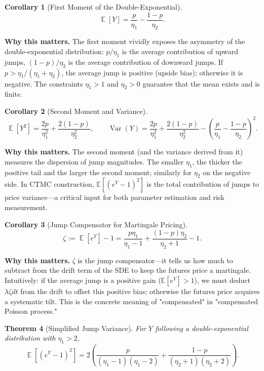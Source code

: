 \documentclass[11pt,a4paper,openany]{book}
\theoremstyle{definition}
\theoremstyle{plain}
\newtheorem{theorem}{Theorem}[chapter]
\newtheorem{corollary}[theorem]{Corollary}
\theoremstyle{remark}
\DeclareMathOperator{\E}{\mathbb{E}}
\DeclareMathOperator{\Var}{Var}
\newcommand{\1}{\mathbbm{1}}
\begin{document}
\begin{corollary}[First Moment of the Double-Exponential]
\[
\E[Y] = \frac{p}{\eta_{1}} - \frac{1-p}{\eta_{2}}.
\]
\end{corollary}

\medskip
\noindent\textbf{Why this matters.} The first moment vividly exposes the asymmetry of the double-exponential distribution: $p/\eta_1$ is the average contribution of upward jumps, $(1-p)/\eta_2$ is the average contribution of downward jumps. If $p > \eta_1/(\eta_1 + \eta_2)$, the average jump is positive (upside bias); otherwise it is negative. The constraints $\eta_1 > 1$ and $\eta_2 > 0$ guarantee that the mean exists and is finite.

\begin{corollary}[Second Moment and Variance]
\[
\E[Y^{2}] = \frac{2p}{\eta_{1}^{2}} + \frac{2(1-p)}{\eta_{2}^{2}}, \qquad
\Var(Y) = \frac{2p}{\eta_{1}^{2}} + \frac{2(1-p)}{\eta_{2}^{2}} - \left(\frac{p}{\eta_{1}} - \frac{1-p}{\eta_{2}}\right)^{2}.
\]
\end{corollary}

\medskip
\noindent\textbf{Why this matters.} The second moment (and the variance derived from it) measures the dispersion of jump magnitudes. The smaller $\eta_1$, the thicker the positive tail and the larger the second moment; similarly for $\eta_2$ on the negative side. In CTMC construction, $\mathbb{E}[(e^Y - 1)^2]$ is the total contribution of jumps to price variance---a critical input for both parameter estimation and risk measurement.

\begin{corollary}[Jump Compensator for Martingale Pricing]
\[
\zeta := \E[e^{Y}] - 1 = \frac{p\eta_{1}}{\eta_{1} - 1} + \frac{(1-p)\eta_{2}}{\eta_{2} + 1} - 1.
\]
\end{corollary}

\medskip
\noindent\textbf{Why this matters.} $\zeta$ is the jump compensator---it tells us how much to subtract from the drift term of the SDE to keep the futures price a martingale. Intuitively: if the average jump is a positive gain ($\mathbb{E}[e^Y] > 1$), we must deduct $\lambda\zeta dt$ from the drift to offset this positive bias; otherwise the futures price acquires a systematic tilt. This is the concrete meaning of "compensated" in "compensated Poisson process."

\begin{theorem}[Simplified Jump Variance]
For $Y$ following a double-exponential distribution with $\eta_{1} > 2$,
\[
\boxed{\E[(e^{Y} - 1)^{2}] = 2\left(\frac{p}{(\eta_{1} - 1)(\eta_{1} - 2)} + \frac{1-p}{(\eta_{2} + 1)(\eta_{2} + 2)}\right)}.
\]
\end{theorem}
\end{document}
